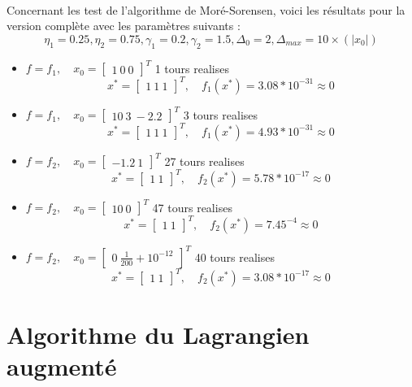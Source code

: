 \documentclass[12pt]{article}
\begin{document}
\paragraph{}
Concernant les test de l'algorithme de Moré-Sorensen, voici les résultats pour la version complète avec les paramètres suivants :
	\[\eta_1 = 0.25, \eta_2 = 0.75, \gamma_1 = 0.2, \gamma_2 = 1.5, \Delta_0 = 2, \Delta_{max} = 10\times(|x_0|)\]
\begin{itemize}
	\item $f=f_1, \quad x_0 = \left[\begin{array}{c}1\ 0\ 0\end{array}\right]^T$ 1 tours realises
			\[x^* = \left[\begin{array}{c}1\ 1\ 1\end{array}\right]^T,\quad f_1(x^*) = 3.08*10^{-31} \approx 0\]
	\item $f=f_1, \quad x_0 = \left[\begin{array}{c}10\ 3\ -2.2\end{array}\right]^T$ 3 tours realises
			\[x^* = \left[\begin{array}{c}1\ 1\ 1\end{array}\right]^T,\quad f_1(x^*) = 4.93*10^{-31} \approx 0\]
	\item $f=f_2, \quad x_0 = \left[\begin{array}{c}-1.2\ 1\end{array}\right]^T$ 27 tours realises
			\[x^* = \left[\begin{array}{c}1\ 1\end{array}\right]^T,\quad f_2(x^*) = 5.78*10^{-17} \approx 0\]
	\item $f=f_2, \quad x_0 = \left[\begin{array}{c}10\ 0\end{array}\right]^T$ 47 tours realises
			\[x^* = \left[\begin{array}{c}1\ 1\end{array}\right]^T ,\quad f_2(x^*) = 7.45^{-4} \approx 0\]
	\item $f=f_2, \quad x_0 = \left[\begin{array}{c}0\ \frac{1}{200} + 10^{-12}\end{array}\right]^T$ 40 tours realises
			\[x^* = \left[\begin{array}{c}1\ 1\end{array}\right]^T,\quad f_2(x^*) = 3.08*10^{-17} \approx 0\]
\end{itemize}

\section{Algorithme du Lagrangien augmenté}
\end{document}
